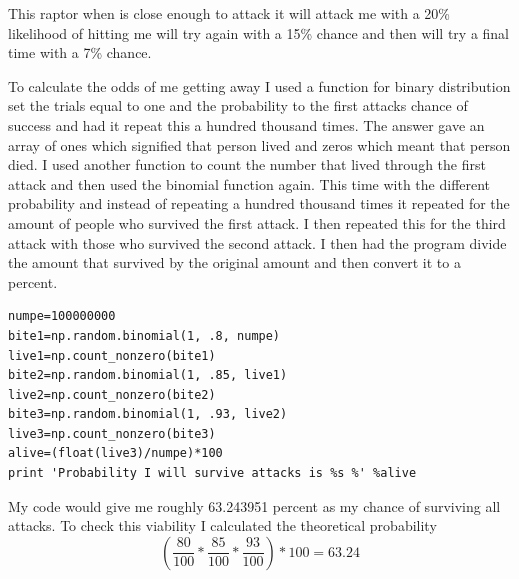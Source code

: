 \documentclass[twocolumn]{revtex4}
\begin{document}
This raptor when is close enough to attack it will attack me with a 20\% likelihood of hitting me will try again with a 15\% chance and then will try a final time with a 7\% chance.


To calculate the odds of me getting away I used a function for binary distribution set the trials equal to one and the probability to the first attacks chance of success and had it repeat this a hundred thousand times. The answer gave an array of ones which signified that person lived and zeros which meant that person died. I used another function to count the number that lived through the first attack and then used the binomial function again. This time with the different probability and instead of repeating a hundred thousand times it repeated for the amount of people who survived the first attack. I then repeated this for the third attack with those who survived the second attack. I then had the program divide the amount that survived by the original amount and then convert it to  a percent.
\begin{lstlisting}
numpe=100000000
bite1=np.random.binomial(1, .8, numpe)
live1=np.count_nonzero(bite1)
bite2=np.random.binomial(1, .85, live1)
live2=np.count_nonzero(bite2)
bite3=np.random.binomial(1, .93, live2)
live3=np.count_nonzero(bite3)
alive=(float(live3)/numpe)*100
print 'Probability I will survive attacks is %s %' %alive
\end{lstlisting}
My code would give me roughly 63.243951 percent as my chance of surviving all attacks. To check this viability I calculated the theoretical probability
$$(\frac{80}{100}*\frac{85}{100}*\frac{93}{100})*100=63.24$$

\end{document}
